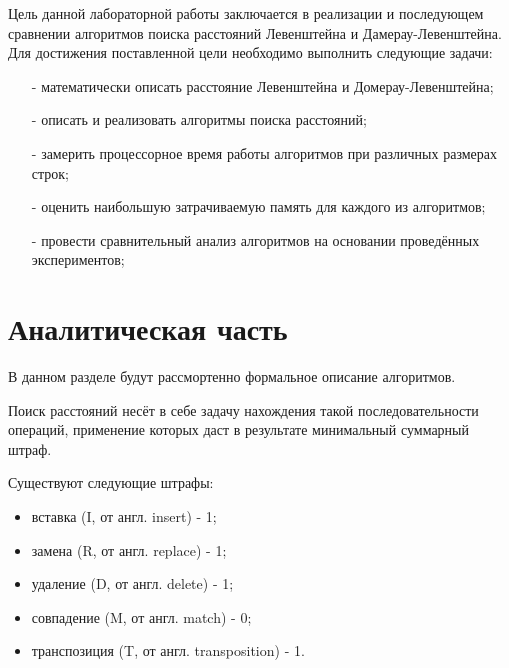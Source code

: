 \documentclass[12pt,a4paper]{report}
\begin{document}



Цель данной лабораторной работы заключается в реализации и последующем сравнении алгоритмов поиска 
расстояний Левенштейна и Дамерау-Левенштейна.\\

Для достижения поставленной цели необходимо выполнить следующие 
задачи:
\begin{enumerate}
    \item[-] математически описать расстояние Левенштейна и Домерау-Левенштейна;
    \item[-] описать и реализовать алгоритмы поиска расстояний;
    \item[-] замерить процессорное время работы алгоритмов при различных размерах строк;
    \item[-] оценить наибольшую затрачиваемую память для каждого из алгоритмов;
    \item[-] провести сравнительный анализ алгоритмов на основании проведённых экспериментов; 
\end{enumerate}

\newpage
\chapter{Аналитическая часть}

В данном разделе будут рассмортенно формальное описание алгоритмов.

Поиск расстояний несёт в себе задачу нахождения такой последовательности операций, применение которых 
даст в результате минимальный суммарный штраф.

Существуют следующие штрафы:
\begin{itemize}
    \item вставка (I, от англ. insert) - 1;
    \item замена (R, от англ. replace) - 1;
    \item удаление (D, от англ. delete) - 1;
    \item совпадение (M, от англ. match) - 0;
    \item транспозиция (T, от англ. transposition) - 1.
\end{itemize}
\end{document}
